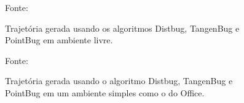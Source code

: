 \documentclass[xcolor=dvipsnames, aspectratio=169]{beamer}
\begin{document}
\begin{frame}
  \newpage
  \begin{figure}
    \centering
    {Fonte: \cite{buniyamin2011simple}}
    \caption{Trajetória gerada usando os algoritmos Distbug, TangenBug e PointBug em ambiente livre.}
    \label{fig:4_trajectory_path}
  \end{figure}
  \newpage
  \begin{figure}
    \centering
    {Fonte: \cite{buniyamin2011simple}}
    \caption{Trajetória gerada usando o algoritmo Distbug, TangenBug e PointBug em um ambiente simples como o do Office.}
    \label{fig:5_trajectory_path}
  \end{figure}
\end{frame}
\end{document}
